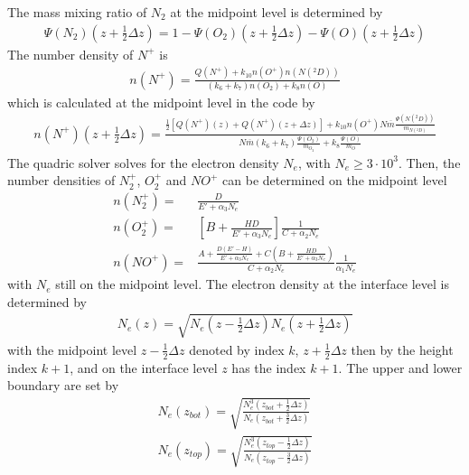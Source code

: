 %
The mass mixing ratio of $N_2$ at the midpoint level is determined
by
%
\begin{align}
  \Psi(N_2)(z+ \frac{1}{2}\Delta z) = 1- \Psi(O_2)(z+ \frac{1}{2}\Delta z) - \Psi(O)(z+ \frac{1}{2}\Delta z)
\end{align}
%
The number density of $N^+$ is
%
\begin{align}
  n(N^+) = \frac{Q(N^+) + k_{10}n(O^+)n(N(^2D))}{(k_6 + k_7)n(O_2) + k_8 n(O)}
\end{align}
%
which is calculated  at the midpoint level in the code by
%
\begin{align}
  n(N^+)(z+ \frac{1}{2}\Delta z) =  \frac{ \frac{1}{2}\left[Q(N^+)(z) + Q(N^+)(z+ \Delta z) \right] +
         k_{10}n(O^+)N \overline{m} \frac{\Psi(N(^2D))}{m_{N(^2D)}}}
         {N \overline{m}(k_6 + k_7)\frac{\Psi(O_2)}{m_{O_2}} + k_8
         \frac{\Psi(O)}{m_{O}}}
\end{align}
%
The quadric solver solves for the electron density $N_e$, with $N_e
\geq 3 \cdot 10^3$. Then, the number densities of $N_2^+$, $O_2^+$
and $NO^+$ can be determined on the midpoint level
%
\begin{align}
  n(N_2^+) = & \frac{D}{E' + \alpha_3 N_e} \\
  n(O_2^+) = & \left[ B + \frac{HD}{E' + \alpha_3 N_e}
               \right]\frac{1}{C+\alpha_2 N_e} \\
  n(NO^+) = & \frac{A + \frac{D(E' - H)}{E'+ \alpha_3 N_e} + C \left( B+ \frac{HD}{E' + \alpha_3 N_e}\right)}
  {C+\alpha_2 N_e} \frac{1}{\alpha_1 N_e}
\end{align}
%
with $N_e$ still on the midpoint level. The electron density at the
interface level is determined by
%
\begin{align}
  N_e (z) = \sqrt{N_e(z-\frac{1}{2}\Delta z) N_e(z+\frac{1}{2}\Delta z)}
\end{align}
%
with the midpoint level  $z-\frac{1}{2}\Delta z$ denoted by index
$k$,  $z+\frac{1}{2}\Delta z$ then by the height index $k+1$, and on
the interface level $z$ has the index $k+1$. The upper and lower
boundary are set by
%
\begin{align}
  N_e (z_{bot}) = \sqrt{\frac{N_e^3(z_{bot}+\frac{1}{2}\Delta z)}{N_e(z_{bot}+\frac{3}{2}\Delta
  z)}} \\
  N_e (z_{top}) = \sqrt{\frac{N_e^3(z_{top}-\frac{1}{2}\Delta z)}{N_e(z_{top}-\frac{3}{2}\Delta
  z)}}
\end{align}
%
